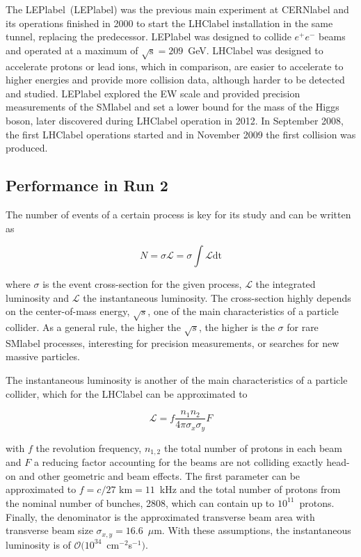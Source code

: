 The \acrlong{LEPlabel}~(\acrshort{LEPlabel}) was the previous main experiment at \acrshort{CERNlabel} and its operations finished in 2000 to start the \acrshort{LHClabel} installation in the same tunnel, replacing the predecessor. \acrshort{LEPlabel} was designed to collide $e^+e^-$ beams and operated at a maximum of $\sqrt{\text{s}}=209$~GeV. \acrshort{LHClabel} was designed to accelerate protons or lead ions, which in comparison, are easier to accelerate to higher energies and provide more collision data, although harder to be detected and studied. \acrshort{LEPlabel} explored the \acrshort{EW} scale and provided precision measurements of the \acrshort{SMlabel} and set a lower bound for the mass of the Higgs boson, later discovered during \acrshort{LHClabel} operation in 2012. In September 2008, the first \acrshort{LHClabel} operations started and in November 2009 the first collision was produced. 

\subsection{Performance in Run 2}

The number of events of a certain process is key for its study and can be written as

\begin{equation}
    N = \sigma\mathscr{L} = \sigma \int \mathcal{L} \text{dt}
\end{equation}

where $\sigma$ is the event cross-section for the given process, $\mathscr{L}$ the integrated luminosity and $\mathcal{L}$ the instantaneous luminosity. The cross-section highly depends on the center-of-mass energy, $\sqrt{s}$, one of the main characteristics of a particle collider. As a general rule, the higher the $\sqrt{s}$, the higher is the $\sigma$ for rare \acrshort{SMlabel} processes, interesting for precision measurements, or searches for new massive particles.

The instantaneous luminosity is another of the main characteristics of a particle collider, which for the \acrshort{LHClabel} can be approximated to

\begin{equation}
    \mathcal{L} = f \frac{n_1n_2}{4\pi\sigma_x\sigma_y} F
\end{equation}

with $f$ the revolution frequency, $n_{1,2}$ the total number of protons in each beam and $F$ a reducing factor accounting for the beams are not colliding exactly head-on and other geometric and beam effects. The first parameter can be approximated to $f=c/27\text{ km} = 11$~kHz and the total number of protons from the nominal number of bunches, 2808, which can contain up to $10^{11}$~protons. Finally, the denominator is the approximated transverse beam area with transverse beam size $\sigma_{x,y} = 16.6$~$\mu$m. With these assumptions, the instantaneous luminosity is of $\mathcal{O}(10^{34}$~cm$^{-2}$s$^{-1})$.

